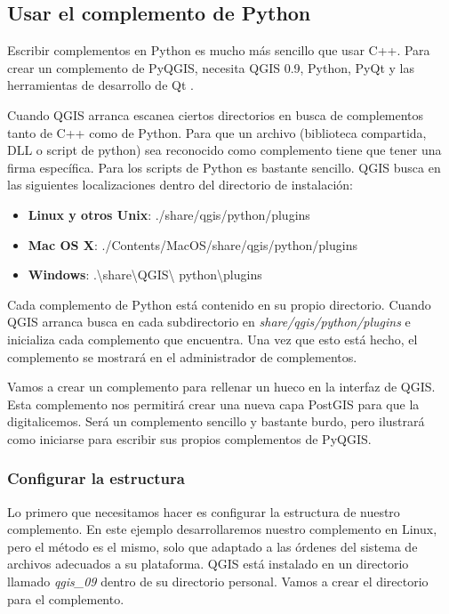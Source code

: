 \subsection{Usar el complemento de Python}

Escribir complementos en Python es mucho más sencillo que usar C++. Para crear un complemento de PyQGIS, 
necesita QGIS 0.9, Python, PyQt y las herramientas de desarrollo de Qt 
\cite{sherman07}.

Cuando QGIS arranca escanea ciertos directorios en busca de complementos tanto de C++ como de Python. 
Para que un archivo (biblioteca compartida, DLL o script de python) sea reconocido como complemento 
tiene que tener una firma específica. Para los scripts de Python es bastante sencillo. QGIS busca 
en las siguientes localizaciones dentro del directorio de instalación:

\begin{itemize}
\item \textbf{Linux y otros Unix}: ./share/qgis/python/plugins
\item \textbf{Mac OS X}: ./Contents/MacOS/share/qgis/python/plugins
\item \textbf{Windows}: .\textbackslash share\textbackslash QGIS\textbackslash
python\textbackslash plugins
\end{itemize}

Cada complemento de Python está contenido en su propio directorio. Cuando QGIS arranca busca en cada 
subdirectorio en \textsl{share/qgis/python/plugins} e inicializa cada complemento que encuentra. 
Una vez que esto está hecho, el complemento se mostrará en el administrador de complementos.

Vamos a crear un complemento para rellenar un hueco en la interfaz de QGIS. Esta complemento nos 
permitirá crear una nueva capa PostGIS para que la digitalicemos. Será un complemento sencillo y 
bastante burdo, pero ilustrará como iniciarse para escribir sus propios complementos de PyQGIS.

\subsubsection{Configurar la estructura}
Lo primero que necesitamos hacer es configurar la estructura de nuestro complemento. En
este ejemplo desarrollaremos nuestro complemento en Linux, pero el método es el mismo, 
solo que adaptado a las órdenes del sistema de archivos adecuados a su plataforma. 
QGIS está instalado en un directorio llamado \textsl{qgis\_09} dentro de su directorio 
personal. Vamos a crear el directorio para el complemento.


